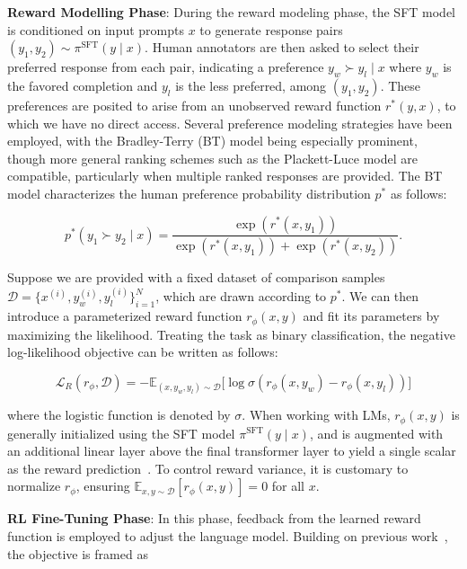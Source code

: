 \textbf{Reward Modelling Phase}: During the reward modeling phase, the SFT model is conditioned on input prompts $x$ to generate response pairs $(y_1, y_2)\sim \pi^\text{SFT}(y \mid x)$. Human annotators are then asked to select their preferred response from each pair, indicating a preference $y_w\succ y_l \mid x$ where $y_w$ is the favored completion and $y_l$ is the less preferred, among $(y_1, y_2)$. These preferences are posited to arise from an unobserved reward function $r^*(y, x)$, to which we have no direct access. Several preference modeling strategies have been employed, with the Bradley-Terry (BT) \cite{bradley1952rankanalysis} model being especially prominent, though more general ranking schemes such as the Plackett-Luce model \citep{plackett1975analysis, luce2012individual} are compatible, particularly when multiple ranked responses are provided. The BT model characterizes the human preference probability distribution $p^*$ as follows:

\begin{equation}\label{eq:bradley-terry}
    p^*(y_1\succ y_2 \mid x)=\frac{\exp\left(r^*(x, y_1)\right)}{\exp\left(r^*(x, y_1)\right) + \exp\left(r^*(x, y_2)\right)}.
\end{equation}

Suppose we are provided with a fixed dataset of comparison samples $\mathcal{D}=\bigl\{x^{(i)}, y_w^{(i)}, y_l^{(i)}\bigr\}_{i=1}^N$, which are drawn according to $p^*$. We can then introduce a parameterized reward function $r_{\phi}(x, y)$ and fit its parameters by maximizing the likelihood. Treating the task as binary classification, the negative log-likelihood objective can be written as follows:

\begin{equation}\label{eq:reward_model}
    \mathcal{L}_R(r_{\phi}, \mathcal{D}) = -\mathbb{E}_{(x, y_w, y_l)\sim \mathcal{D}}\bigl[\log \sigma(r_{\phi}(x, y_w)- r_{\phi}(x, y_l))\bigr]
\end{equation}

where the logistic function is denoted by $\sigma$. When working with LMs, $r_{\phi}(x, y)$ is generally initialized using the SFT model $\pi^\text{SFT}(y \mid x)$, and is augmented with an additional linear layer above the final transformer layer to yield a single scalar as the reward prediction~\cite{ziegler2020finetuning}. To control reward variance, it is customary to normalize $r_\phi$, ensuring $\mathbb{E}_{x,y\sim \mathcal{D}}\left[r_\phi(x, y)\right] = 0$ for all $x$.

\textbf{RL Fine-Tuning Phase}: In this phase, feedback from the learned reward function is employed to adjust the language model. Building on previous work~\citep{jaques2017sequence, jaques2020human}, the objective is framed as

